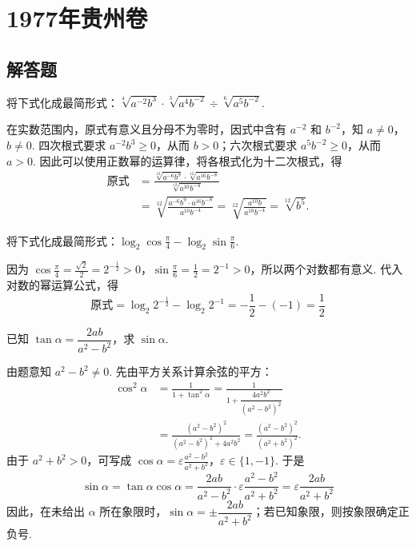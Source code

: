 \chapter{1977年贵州卷}

\section{解答题}

\begin{problem}
将下式化成最简形式：\(\sqrt[4]{a^{-2}b^3}\cdot\sqrt[3]{a^4b^{-2}}\div\sqrt[6]{a^5b^{-2}}\).
\end{problem}

\begin{solution}
在实数范围内，原式有意义且分母不为零时，因式中含有 \(a^{-2}\) 和 \(b^{-2}\)，知 \(a\neq0\)，\(b\neq0\). 四次根式要求 \(a^{-2}b^3\geqslant0\)，从而 \(b>0\)；六次根式要求 \(a^5b^{-2}\geqslant0\)，从而 \(a>0\). 因此可以使用正数幂的运算律，将各根式化为十二次根式，得
\[
\begin{aligned}
\text{原式}
&=\frac{\sqrt[12]{a^{-6}b^9}\cdot\sqrt[12]{a^{16}b^{-8}}}{\sqrt[12]{a^{10}b^{-4}}} \\
&=\sqrt[12]{\frac{a^{-6}b^9\cdot a^{16}b^{-8}}{a^{10}b^{-4}}}
=\sqrt[12]{\frac{a^{10}b}{a^{10}b^{-4}}}
=\sqrt[12]{b^5}.
\end{aligned}
\]
\end{solution}

\begin{problem}
将下式化成最简形式：\(\log_2\cos\frac{\pi}{4}-\log_2\sin\frac{\pi}{6}\).
\end{problem}

\begin{solution}
因为 \(\cos\frac{\pi}{4}=\frac{\sqrt2}{2}=2^{-\frac{1}{2}}>0\)，\(\sin\frac{\pi}{6}=\frac12=2^{-1}>0\)，所以两个对数都有意义. 代入对数的幂运算公式，得
\[
\text{原式}
=\log_2 2^{-\frac{1}{2}}-\log_2 2^{-1}
=-\frac12-(-1)=\frac12
\]
\end{solution}

\begin{problem}
已知 \(\tan\alpha=\dfrac{2ab}{a^2-b^2}\)，求 \(\sin\alpha\).
\end{problem}

\begin{solution}
由题意知 \(a^2-b^2\neq0\). 先由平方关系计算余弦的平方：
\[
\begin{aligned}
\cos^2\alpha
&=\frac{1}{1+\tan^2\alpha}
=\frac{1}{1+\dfrac{4a^2b^2}{(a^2-b^2)^2}} \\
&=\frac{(a^2-b^2)^2}{(a^2-b^2)^2+4a^2b^2}
=\frac{(a^2-b^2)^2}{(a^2+b^2)^2}.
\end{aligned}
\]
由于 \(a^2+b^2>0\)，可写成
\(\cos\alpha=\varepsilon\frac{a^2-b^2}{a^2+b^2}\)，\(\varepsilon\in\{1,-1\}\).
于是
\[
\sin\alpha=\tan\alpha\cos\alpha
=\frac{2ab}{a^2-b^2}\cdot\varepsilon\frac{a^2-b^2}{a^2+b^2}
=\varepsilon\frac{2ab}{a^2+b^2}
\]
因此，在未给出 \(\alpha\) 所在象限时，\(\sin\alpha=\pm\dfrac{2ab}{a^2+b^2}\)；若已知象限，则按象限确定正负号.
\end{solution}

